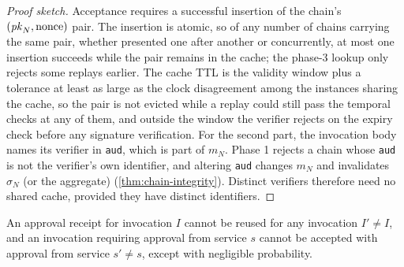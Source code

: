 \documentclass[11pt,a4paper]{article}
\begin{document}
\begin{proof}[Proof sketch]
Acceptance requires a successful insertion of the chain's
$(\mathit{pk}_N, \text{nonce})$ pair. The insertion is atomic, so of any number
of chains carrying the same pair, whether presented one after another or
concurrently, at most one insertion succeeds while the pair remains in
the cache; the phase-3 lookup only rejects some replays earlier. The
cache TTL is the validity window plus a tolerance at least as large as
the clock disagreement among the instances sharing the cache, so the
pair is not evicted while a replay could still pass the temporal checks
at any of them, and
outside the window the verifier rejects on the expiry check before any
signature verification. For the second part, the invocation body names
its verifier in \texttt{aud}, which is part of $m_N$. Phase 1 rejects a
chain whose \texttt{aud} is not the verifier's own identifier, and
altering \texttt{aud} changes $m_N$ and invalidates $\sigma_N$ (or the
aggregate)
(\cref{thm:chain-integrity}). Distinct verifiers therefore need no
shared cache, provided they have distinct identifiers.
\end{proof}

\begin{theorem}
\label{thm:approval-binding}
An approval receipt for invocation $I$ cannot be reused for any
invocation $I' \neq I$, and an invocation requiring approval from
service $s$ cannot be accepted with approval from service $s' \neq s$,
except with negligible probability.
\end{theorem}
\end{document}
